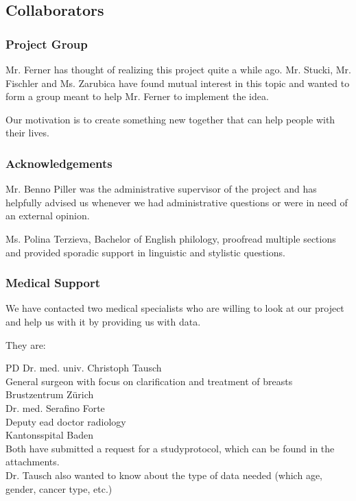 \subsection{Collaborators}
\subsubsection{Project Group}
Mr. Ferner has thought of realizing this project quite a while ago.
Mr. Stucki, Mr. Fischler and Ms. Zarubica have found mutual interest in this topic and wanted to form a group meant to help Mr. Ferner to implement the idea.

Our motivation is to create something new together that can help people with their lives. 

\subsubsection{Acknowledgements}
Mr. Benno Piller was the administrative supervisor of the project and has helpfully advised us whenever we had administrative questions or were in need of an external opinion.

Ms. Polina Terzieva, Bachelor of English philology, proofread multiple sections and provided sporadic support in linguistic and stylistic questions.

\subsubsection{Medical Support}

We have contacted two medical specialists who are willing to look at our project and help us with it by providing us with data.

They are:

PD Dr. med. univ. Christoph Tausch\\
General surgeon with focus on clarification and treatment of breasts\\
Brustzentrum Zürich\\


Dr. med. Serafino Forte\\
Deputy ead doctor radiology\\
Kantonsspital Baden\\

Both have submitted a request for a studyprotocol, which can be found in the attachments. \\
Dr. Tausch also wanted to know about the type of data needed (which age, gender, cancer type, etc.)